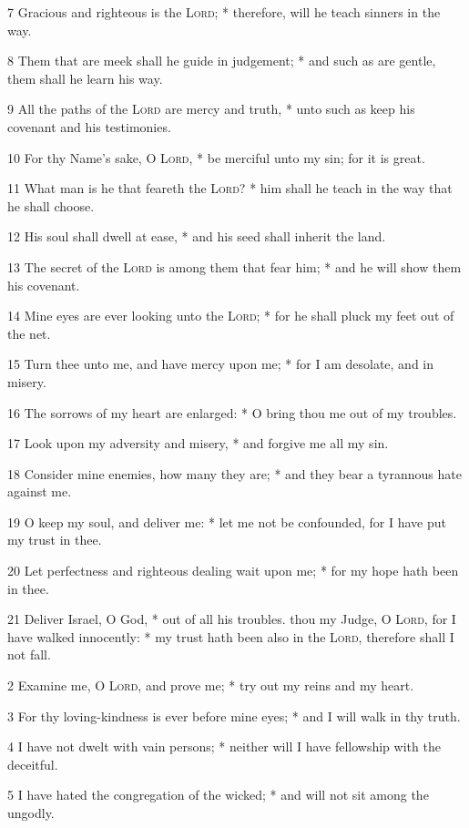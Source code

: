 7 Gracious and righteous is the {\textsc{Lord}}; * therefore, will he teach sinners in the way.\par
8 Them that are meek shall he guide in judgement; * and such as are gentle, them shall he learn his way.\par
9 All the paths of the {\textsc{Lord}} are mercy and truth, * unto such as keep his covenant and his testimonies.\par
10 For thy Name's sake, O {\textsc{Lord}}, * be merciful unto my sin; for it is great.\par
11 What man is he that feareth the {\textsc{Lord}}? * him shall he teach in the way that he shall choose.\par
12 His soul shall dwell at ease, * and his seed shall inherit the land.\par
13 The secret of the {\textsc{Lord}} is among them that fear him; * and he will show them his covenant.\par
14 Mine eyes are ever looking unto the {\textsc{Lord}}; * for he shall pluck my feet out of the net.\par
15 Turn thee unto me, and have mercy upon me; * for I am desolate, and in misery.\par
16 The sorrows of my heart are enlarged: * O bring thou me out of my troubles.\par
17 Look upon my adversity and misery, * and forgive me all my sin.\par
18 Consider mine enemies, how many they are; * and they bear a tyrannous hate against me.\par
19 O keep my soul, and deliver me: * let me not be confounded, for I have put my trust in thee.\par
20 Let perfectness and righteous dealing wait upon me; * for my hope hath been in thee.\par
21 Deliver Israel, O God, * out of all his troubles.
 thou my Judge, O {\textsc{Lord}}, for I have walked innocently: * my trust hath been also in the {\textsc{Lord}}, therefore shall I not fall.\par
2 Examine me, O {\textsc{Lord}}, and prove me; * try out my reins and my heart.\par
3 For thy loving-kindness is ever before mine eyes; * and I will walk in thy truth.\par
4 I have not dwelt with vain persons; * neither will I have fellowship with the deceitful.\par
5 I have hated the congregation of the wicked; * and will not sit among the ungodly.\par
